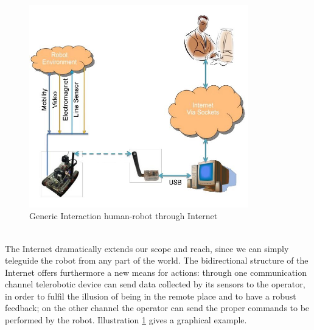 \begin{figure}
  \begin{center}
    \includegraphics[width=270pt]{img/user_robot_inter.jpg}
    \caption{Generic Interaction human-robot through Internet}
    \label{fig:user_robot_inter}
  \end{center}
\end{figure}
\\
The Internet dramatically extends our scope and reach, since we can simply
teleguide the robot from any part of the world. The bidirectional
structure of the Internet offers furthermore a new means for actions:
through one communication channel telerobotic device can send data
collected by its sensors to the operator, in order to fulfil the
illusion of being in the remote place and to have a robust feedback;
on the other channel the operator can send the proper commands to
be performed by the robot. Illustration \ref{fig:user_robot_inter}
gives a graphical example.
